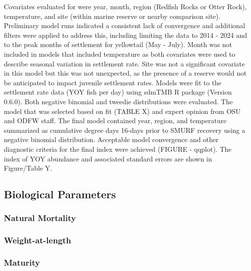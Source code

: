 \documentclass[
]{scrartcl}
\begin{document}
Covariates evaluated for were year, month, region (Redfish Rocks or
Otter Rock), temperature, and site (within marine reserve or nearby
comparison site). Preliminary model runs indicated a consistent lack of
convergence and additional filters were applied to address this,
including limiting the data to 2014 - 2024 and to the peak months of
settlement for yellowtail (May - July). Month was not included in models
that included temperature as both covariates were used to describe
seasonal variation in settlement rate. Site was not a significant
covariate in this model but this was not unexpected, as the presence of
a reserve would not be anticipated to impact juvenile settlement rates.
Models were fit to the settlement rate data (YOY fish per day) using
sdmTMB R package (Version 0.6.0). Both negative binomial and tweedie
distributions were evaluated. The model that was selected based on fit
(TABLE X) and expert opinion from OSU and ODFW staff. The final model
contained year, region, and temperature summarized as cumulative degree
days 16-days prior to SMURF recovery using a negative binomial
distribution. Acceptable model convergence and other diagnostic criteria
for the final index were achieved (FIGURE - qqplot). The index of YOY
abundance and associated standard errors are shown in Figure/Table Y.

\subsection{Biological Parameters}\label{biological-parameters}

\subsubsection{Natural Mortality}\label{natural-mortality}

\subsubsection{Weight-at-length}\label{weight-at-length}

\subsubsection{Maturity}\label{maturity}
\end{document}
